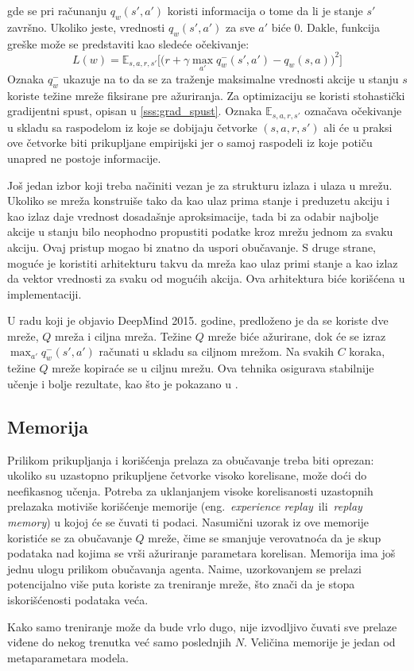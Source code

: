 gde se pri računanju $q_w(s',a')$ koristi informacija o tome da li je stanje $s'$ završno. Ukoliko jeste, vrednosti $q_w(s',a')$ za sve $a'$ biće $0$. Dakle, funkcija greške može se predstaviti kao sledeće očekivanje:
\begin{equation}
	L(w) = \mathbb{E}_{s,a,r,s'}\bigg[ \big(r + \gamma \max_{a'}q_w^-(s',a') - q_w(s,a)\big) ^2 \bigg]
\end{equation} %
Oznaka $q_w^-$ ukazuje na to da se za traženje maksimalne vrednosti akcije u stanju $s$ koriste težine mreže fiksirane pre ažuriranja. Za optimizaciju se koristi stohastički gradijentni spust, opisan u \ref{sss:grad_spust}. Oznaka $\mathbb{E}_{s,a,r,s'}$ označava očekivanje u skladu sa raspodelom iz koje se dobijaju četvorke $(s,a,r,s')$ ali će u praksi ove četvorke biti prikupljane empirijski jer o samoj raspodeli iz koje potiču unapred ne postoje informacije. 
\par 
Još jedan izbor koji treba načiniti vezan je za strukturu izlaza i ulaza u mrežu. Ukoliko se mreža konstruiše tako da kao ulaz prima stanje i preduzetu akciju i kao izlaz daje vrednost dosadašnje aproksimacije, tada bi za odabir najbolje akcije u stanju bilo neophodno propustiti podatke kroz mrežu jednom za svaku akciju. Ovaj pristup mogao bi znatno da uspori obučavanje. S druge strane, moguće je koristiti arhitekturu takvu da mreža kao ulaz primi stanje a kao izlaz da vektor vrednosti za svaku od mogućih akcija. Ova arhitektura biće korišćena u implementaciji.
\par 
U radu koji je objavio DeepMind 2015. godine, predloženo je da se koriste dve mreže, $Q$ mreža i ciljna mreža. Težine $Q$ mreže biće ažurirane, dok će se izraz $\max_{a'}q_w^-(s',a')$ računati u skladu sa ciljnom mrežom. Na svakih $C$ koraka, težine $Q$ mreže kopiraće se u ciljnu mrežu. Ova tehnika osigurava stabilnije učenje i bolje rezultate, kao što je pokazano u \cite{dqn_dm}.

\subsection{Memorija}
Prilikom prikupljanja i korišćenja prelaza za obučavanje treba biti oprezan: ukoliko su uzastopno prikupljene četvorke visoko korelisane, može doći do neefikasnog učenja. Potreba za uklanjanjem visoke korelisanosti uzastopnih prelazaka motiviše korišćenje memorije (eng.~{\em experience replay}~ili~{\em replay memory}) u kojoj će se čuvati ti podaci. Nasumični uzorak iz ove memorije koristiće se za obučavanje $Q$ mreže, čime se smanjuje verovatnoća da je skup podataka nad kojima se vrši ažuriranje parametara korelisan. Memorija ima još jednu ulogu prilikom obučavanja agenta. Naime, uzorkovanjem se prelazi potencijalno više puta koriste za treniranje mreže, što znači da je stopa iskorišćenosti podataka veća. 
\par 
Kako samo treniranje može da bude vrlo dugo, nije izvodljivo čuvati sve prelaze viđene do nekog trenutka već samo poslednjih $N$. Veličina memorije je jedan od metaparametara modela.


